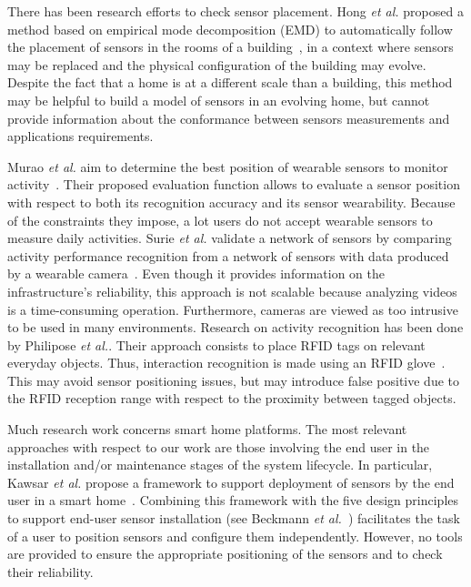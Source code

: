 There has been research efforts to check sensor placement. Hong {\em et al.}  proposed a method based on empirical mode decomposition (EMD) to automatically follow the placement of sensors in the rooms of a building~\cite{HONG-TOWARD-BUILDSYS2013}, in a context where sensors may be replaced and the physical configuration of the building may evolve. Despite the fact that a home is at a different scale than a building, this method may be helpful to build a model of sensors in an evolving home, but cannot provide information about the conformance between sensors measurements and applications requirements.

Murao {\em et al.} aim to determine the best position of wearable sensors to monitor activity~\cite{MURAO-EVALUATION-UBICOMP2013}. Their proposed evaluation function allows to evaluate a sensor position with respect to both its recognition accuracy and its sensor wearability. Because of the constraints they impose, a lot users do not accept wearable sensors to measure daily activities.  Surie {\em et al.} validate a network of sensors by comparing activity performance recognition from a network of sensors with data produced by a wearable camera~\cite{SURIE-WIRELESS-INTELLIGENT2008}. Even though it provides information on the infrastructure's reliability, this approach is not scalable because analyzing videos is a time-consuming operation. Furthermore, cameras are viewed as too intrusive to be used in many environments.  Research on activity recognition has been done by Philipose {\em et al.}. Their approach consists to place RFID tags on relevant everyday objects. Thus, interaction recognition is made using an RFID glove~\cite{PHILIPOSE-INFERRING-PERVASIVE2004}.  This may avoid sensor positioning issues, but may introduce false positive due to the RFID reception range with respect to the proximity between tagged objects.

Much research work concerns smart home platforms. The most relevant approaches with respect to our work are those involving the end user in the installation and/or maintenance stages of the system lifecycle. In particular, Kawsar {\em et al.}  propose a framework to support deployment of sensors by the end user in a smart home~\cite{KASWAR-DEPLOY-UBICOMP2008}. Combining this framework with the five design principles to support end-user sensor installation (see Beckmann {\em et al.}~\cite{BECKMANN-SOME-UBICOMP2004}) facilitates the task of a user to position sensors and configure them independently. However, no tools are provided to ensure the appropriate positioning of the sensors and to check their reliability.

